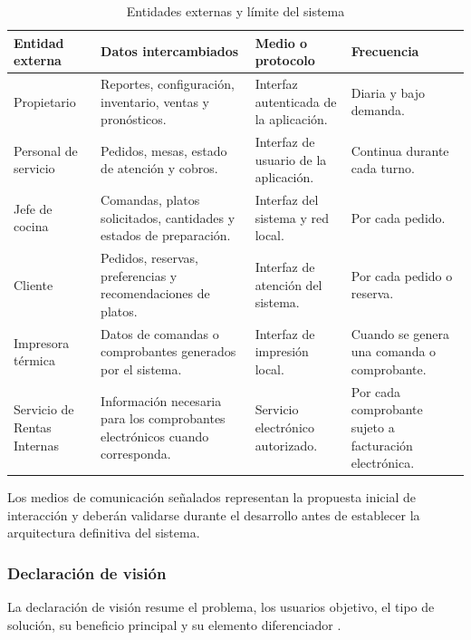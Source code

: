 \begin{table}[H]
\centering
\footnotesize
\caption{Entidades externas y límite del sistema}
\label{tab:limite-sistema}
\begin{tabularx}{\textwidth}
{@{}p{}p{}p{}Y@{}}
\toprule
\textbf{Entidad externa} &
\textbf{Datos intercambiados} &
\textbf{Medio o protocolo} &
\textbf{Frecuencia} \\
\midrule

Propietario &
Reportes, configuración, inventario, ventas y pronósticos. &
Interfaz autenticada de la aplicación. &
Diaria y bajo demanda. \\

Personal de servicio &
Pedidos, mesas, estado de atención y cobros. &
Interfaz de usuario de la aplicación. &
Continua durante cada turno. \\

Jefe de cocina &
Comandas, platos solicitados, cantidades y estados de preparación. &
Interfaz del sistema y red local. &
Por cada pedido. \\

Cliente &
Pedidos, reservas, preferencias y recomendaciones de platos. &
Interfaz de atención del sistema. &
Por cada pedido o reserva. \\

Impresora térmica &
Datos de comandas o comprobantes generados por el sistema. &
Interfaz de impresión local. &
Cuando se genera una comanda o comprobante. \\

Servicio de Rentas Internas &
Información necesaria para los comprobantes electrónicos cuando corresponda. &
Servicio electrónico autorizado. &
Por cada comprobante sujeto a facturación electrónica. \\

\bottomrule
\end{tabularx}
\end{table}

Los medios de comunicación señalados representan la propuesta inicial de
interacción y deberán validarse durante el desarrollo antes de establecer la
arquitectura definitiva del sistema.

\subsubsection{Declaración de visión}

La declaración de visión resume el problema, los usuarios objetivo, el tipo
de solución, su beneficio principal y su elemento diferenciador
\cite{moore2014}.

